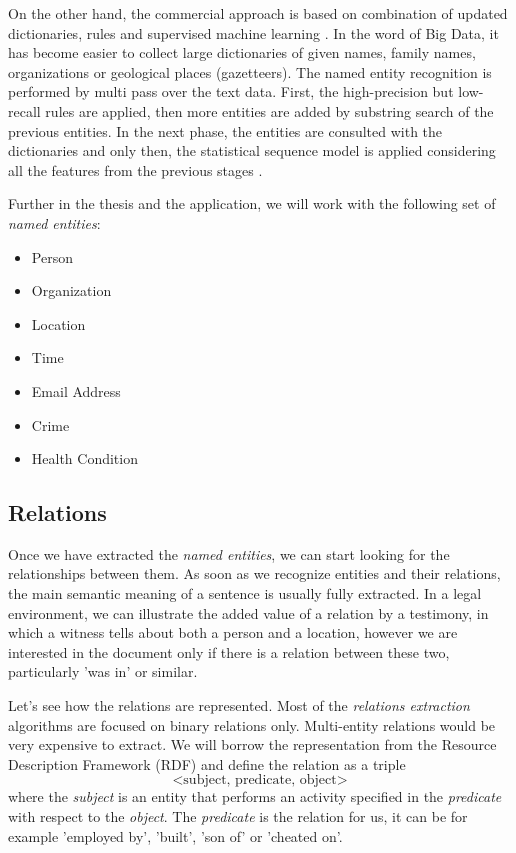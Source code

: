 \documentclass[
  digital, %
  table,   %
  lof,     %
  lot,     %
]{fithesis3}
\begin{document}
On the other hand, the commercial approach is based on combination of updated dictionaries, rules and supervised machine learning \cite{chiticariu2013rule}.
In the word of Big Data, it has become easier to collect large dictionaries of given names, family names, organizations or geological places (gazetteers).
The named entity recognition is performed by multi pass over the text data.
First, the high-precision but low-recall rules are applied, then more entities are added by substring search of the previous entities.
In the next phase, the entities are consulted with the dictionaries and only then, the statistical sequence model is applied considering all the features from the previous stages \cite[ch. 21]{jurafsky2014speech}.

Further in the thesis and the application, we will work with the following set of \textit{named entities}:
\begin{itemize}
\item Person
\item Organization
\item Location
\item Time
\item Email Address
\item Crime
\item Health Condition
\end{itemize}

\subsection{Relations}
Once we have extracted the \textit{named entities}, we can start looking for the relationships between them.
As soon as we recognize entities and their relations, the main semantic meaning of a sentence is usually fully extracted.
In a legal environment, we can illustrate the added value of a relation by a testimony, in which a witness tells about both a person and a location, however we are interested in the document only if there is a relation between these two, particularly 'was in' or similar.

Let's see how the relations are represented.
Most of the \textit{relations extraction} algorithms are focused on binary relations only.
Multi-entity relations would be very expensive to extract.
We will borrow the representation from the Resource Description Framework (RDF) \cite{lassila1999resource} and define the relation as a triple
$$
\text{<subject, predicate, object>}
$$
where the \textit{subject} is an entity that performs an activity specified in the \textit{predicate} with respect to the \textit{object}.
The \textit{predicate} is the relation for us, it can be for example 'employed by', 'built', 'son of' or 'cheated on'.
\end{document}
